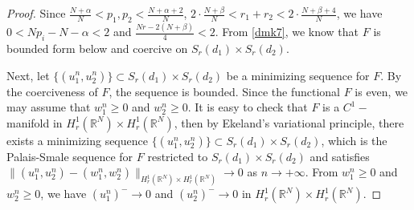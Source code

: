\documentclass[reqno]{amsart}
\begin{document}
\begin{proof}
Since $\frac{N+\alpha}{N}<p_1,p_2<\frac{N+\alpha+2}{N}$, 
$2\cdot\frac{N+\beta}{N}<r_1+r_2<2\cdot\frac{N+\beta+4}{N}$, we have $0<Np_i-N-\alpha<2$ 
and $\frac{Nr-2(N+\beta)}{4}<2$.
From \eqref{dmk7}, we know that $F$ is bounded form below and coercive on 
$S_{r}(d_1)\times S_{r}(d_2)$.

Next, let $\{(u_1^n,u_2^n)\}\subset S_{r}(d_1)\times S_{r}(d_2)$ be a minimizing 
sequence for $F$. By the coerciveness of $F$, the sequence is
bounded. Since the functional $F$ is even, we may assume that $w_1^n\geq0$ and 
$w_2^n\geq0$. It is easy to check that $F$ is a $C^1-$manifold in
$H_r^1(\mathbb{R}^N)\times H_r^1(\mathbb{R}^N)$, then by Ekeland's variational 
principle, there exists a minimizing sequence
$\{(u_1^n,u_2^n)\}\subset S_{r}(d_1)\times S_{r}(d_2)$, which is the Palais-Smale 
sequence for $F$ restricted to $S_{r}(d_1)\times S_{r}(d_2)$ and satisfies
$\| (u_1^n,u_2^n)-(w_1^n,w_2^n)\|_{H_r^1(\mathbb{R}^N)\times H_r^1(\mathbb{R}^N)}\to 0$ 
as $n\to +\infty$.
From $w_1^n\geq0$ and $w_2^n\geq0$, we have $(u_1^n)^-\to 0$ and $(u_2^n)^-\to 0$ in 
$H_r^1(\mathbb{R}^N)\times H_r^1(\mathbb{R}^N)$.
\end{proof}
\end{document}
